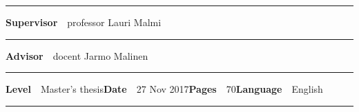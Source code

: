 \begin{spacing}{.88}
{  \vspace{-2.4mm}\rule{\textwidth}{.75pt}

  {\fontsize{10.5pt}{10.5pt}\bfseries\sffamily\lsstyle Supervisor}~~{\small professor Lauri Malmi}

  \vspace{-2.4mm}\rule{\textwidth}{.75pt}

  {\fontsize{10.5pt}{10.5pt}\bfseries\sffamily\lsstyle Advisor}~~{\small docent Jarmo Malinen}

  \vspace{-2.4mm}\rule{\textwidth}{.75pt}

  {\fontsize{10.5pt}{10.5pt}\bfseries\sffamily\lsstyle Level}~~{\small Master's thesis}\hfill{\fontsize{10.5pt}{10.5pt}\bfseries\sffamily\lsstyle Date}~~{\small 27 Nov 2017}\hfill{\fontsize{10.5pt}{10.5pt}\bfseries\sffamily\lsstyle Pages}~~{\small 70}\hfill{\fontsize{10.5pt}{10.5pt}\bfseries\sffamily\lsstyle Language}~~{\small English}

  \vspace{-2.4mm}\rule{\textwidth}{.75pt}

  \vspace{6mm}

  } %
  \end{spacing}
